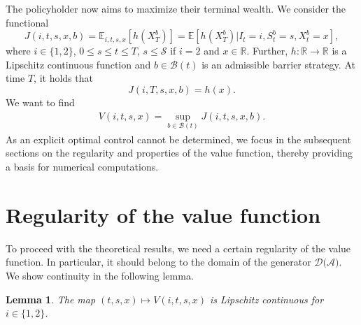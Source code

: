 \documentclass[a4paper]{scrartcl}
\newtheorem{lemma}{Lemma}[section]
\theoremstyle{remark}
\theoremstyle{definition}
\numberwithin{equation}{section}
\begin{document}
The policyholder now aims to maximize their terminal wealth. We consider the functional
\begin{equation*}
    J(i,t,s,x,b)=\mathbb{E}_{i,t,s,x}[h(X^b_T)]=\mathbb{E}[h(X^b_T)|I_t=i,S_t^b=s,X_t^b=x],
\end{equation*}
where $i \in \{1,2\}$, $0\leq s \leq t \leq T$, $s \leq \mathcal{S}$ if $i=2$ and $x \in \mathbb{R}$. 
Further, $h:\mathbb{R}\rightarrow\mathbb{R}$ is a Lipschitz continuous function and $b \in \mathcal{B}(t)$ is an admissible barrier strategy. At time $T$, it holds that
\begin{equation*}
    J(i,T,s,x,b)=h(x).
\end{equation*}
We want to find 
\begin{align*}
    V(i,t,s,x)=\sup_{b \in \mathcal{B}(t)}J(i,t,s,x,b).
\end{align*}
As an explicit optimal control cannot be determined, we focus in the subsequent sections on the regularity and properties of the value function, thereby providing a basis for numerical computations.
\section{Regularity of the value function}
\label{sec:valueFunction}
To proceed with the theoretical results, we need a certain regularity of the value function. In particular, it should belong to the domain of the generator $\mathcal{D}(\mathcal{A)}$. We show continuity in the following lemma.
\begin{lemma}
    The map $(t,s,x) \mapsto V(i,t,s,x)$ is Lipschitz continuous for $i \in \{1,2\}$.
\end{lemma}
\end{document}
